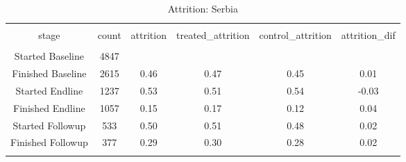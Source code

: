 
\begin{table}[H] \centering 
  \caption{Attrition: Serbia} 
  \label{tbl:Attrition: Serbia} 
\begin{tabular}{@{\extracolsep{5pt}} cccccc} 
\\[-1.8ex]\hline 
\hline \\[-1.8ex] 
stage & count & attrition & treated\_attrition & control\_attrition & attrition\_dif \\ 
\hline \\[-1.8ex] 
Started Baseline & 4847 &  &  &  &  \\ 
Finished Baseline & 2615 & 0.46 & 0.47 & 0.45 &  0.01 \\ 
Started Endline & 1237 & 0.53 & 0.51 & 0.54 & -0.03 \\ 
Finished Endline & 1057 & 0.15 & 0.17 & 0.12 &  0.04 \\ 
Started Followup &  533 & 0.50 & 0.51 & 0.48 &  0.02 \\ 
Finished Followup &  377 & 0.29 & 0.30 & 0.28 &  0.02 \\ 
\hline \\[-1.8ex] 
\end{tabular} 
\end{table} 
